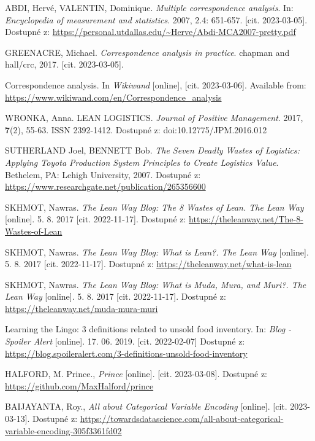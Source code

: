 \begin{thebibliography}{1}
ABDI, Hervé, VALENTIN, Dominique. \textit{Multiple correspondence analysis}. In: \textit{Encyclopedia of measurement and statistics}. 2007, 2.4: 651-657. [cit. 2023-03-05]. Dostupné z: \url{https://personal.utdallas.edu/\~Herve/Abdi-MCA2007-pretty.pdf}

GREENACRE, Michael. \textit{Correspondence analysis in practice}. chapman and hall/crc, 2017. [cit. 2023-03-05]. 

Correspondence analysis. In \textit{Wikiwand} [online], [cit. 2023-03-06]. Available from: \url{https://www.wikiwand.com/en/Correspondence\_analysis}

WRONKA, Anna. LEAN LOGISTICS. \textit{Journal of Positive Management}. 2017, \textbf{7}(2), 55-63. ISSN 2392-1412. Dostupné z: doi:10.12775/JPM.2016.012

SUTHERLAND Joel, BENNETT Bob. \textit{The Seven Deadly Wastes of Logistics: Applying Toyota Production System Principles to Create Logistics Value}. Bethelem, PA: Lehigh University, 2007. Dostupné z: \url{https://www.researchgate.net/publication/265356600}

SKHMOT, Nawras. \textit{The Lean Way Blog: The 8 Wastes of Lean. The Lean Way} [online]. 5. 8. 2017 [cit. 2022-11-17]. Dostupné z: \url{https://theleanway.net/The-8-Wastes-of-Lean}

SKHMOT, Nawras. \textit{The Lean Way Blog: What is Lean?. The Lean Way} [online]. 5. 8. 2017 [cit. 2022-11-17]. Dostupné z: \url{https://theleanway.net/what-is-lean}

SKHMOT, Nawras. \textit{The Lean Way Blog: What is Muda, Mura, and Muri?. The Lean Way} [online]. 5. 8. 2017 [cit. 2022-11-17]. Dostupné z:
 \url{https://theleanway.net/muda-mura-muri}

Learning the Lingo: 3 definitions related to unsold food inventory. In: \textit{Blog - Spoiler Alert} [online]. 17. 06. 2019. [cit. 2022-02-07] Dostupné z: \url{https://blog.spoileralert.com/3-definitions-unsold-food-inventory}

HALFORD, M. Prince., \textit{Prince} [online]. [cit. 2023-03-08]. Dostupné z: \url{https://github.com/MaxHalford/prince}

BAIJAYANTA, Roy., \textit{All about Categorical Variable Encoding } [online]. [cit. 2023-03-13]. Dostupné z: \url{https://towardsdatascience.com/all-about-categorical-variable-encoding-305f3361fd02}


\end{thebibliography}
